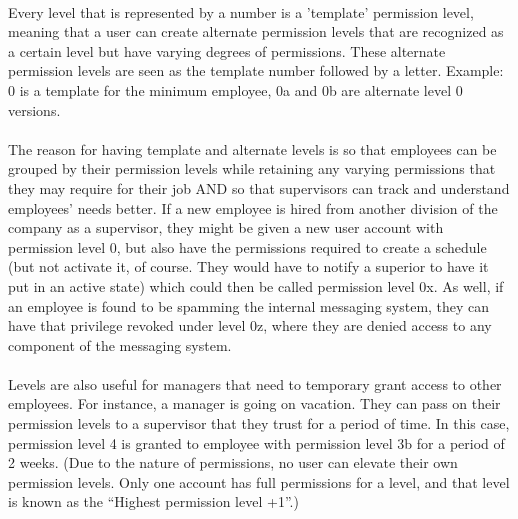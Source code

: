 \documentclass[letterpaper,12pt]{report}
\begin{document}
\paragraph*{}\hspace{0.6cm}Every level that is represented by a number is a 'template' permission level,  meaning that a user can create alternate permission levels that are recognized as a certain level but have varying degrees of permissions. These alternate permission levels are seen as the template number followed by a letter.\newline
\newline
	\hspace*{0.8cm} Example: 0 is a template for the minimum employee, 0a and 0b are alternate level 0 versions.\newline
\newline
\paragraph*{}\hspace{0.6cm}The reason for having template and alternate levels is so that employees can be grouped by their permission levels while retaining any varying permissions that they may require for their job AND so that supervisors can track and understand employees' needs better. If a new employee is hired from another division of the company as a supervisor, they might be given a new user account with permission level 0, but also have the permissions required to create a schedule (but not activate it, of course. They would have to notify a superior to have it put in an active state) which could then be called permission level 0x. As well, if an employee is found to be spamming the internal messaging system, they can have that privilege revoked under level 0z, where they are denied access to any component of the messaging system.
\paragraph*{}\hspace{0.6cm}Levels are also useful for managers that need to temporary grant access to other employees. For instance, a manager is going on vacation. They can pass on their permission levels to a supervisor that they trust for a period of time. In this case, permission level 4 is granted to employee with permission level 3b for a period of 2 weeks. (Due to the nature of permissions, no user can elevate their own permission levels. Only one account has full permissions for a level, and that level is known as the “Highest permission level +1”.)
\pagebreak
\end{document}
